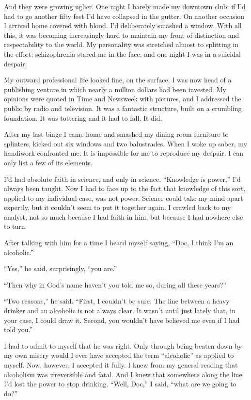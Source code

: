 \begin{biblechapter}
And they were growing uglier. One night I barely made my downtown club; if I’d had to go another fifty feet I’d have collapsed in the gutter. On another occasion I arrived home covered with blood. I’d deliberately smashed a window. With all this, it was becoming increasingly hard to maintain my front of distinction and respectability to the world. My personality was stretched almost to splitting in the effort; schizophrenia stared me in the face, and one night I was in a suicidal despair.

My outward professional life looked fine, on the surface. I was now head of a publishing venture in which nearly a million dollars had been invested. My opinions were quoted in Time and Newsweek with pictures, and I addressed the public by radio and television. It was a fantastic structure, built on a crumbling foundation. It was tottering and it had to fall. It did.

After my last binge I came home and smashed my dining room furniture to splinters, kicked out six windows and two balustrades. When I woke up sober, my handiwork confronted me. It is impossible for me to reproduce my despair. I can only list a few of its elements.

I’d had absolute faith in science, and only in science. “Knowledge is power,” I’d always been taught. Now I had to face up to the fact that knowledge of this sort, applied to my individual case, was not power. Science could take my mind apart expertly, but it couldn’t seem to put it together again. I crawled back to my analyst, not so much because I had faith in him, but because I had nowhere else to turn.

After talking with him for a time I heard myself saying, “Doc, I think I’m an alcoholic.”

“Yes,” he said, surprisingly, “you are.”

“Then why in God’s name haven’t you told me so, during all these years?”

“Two reasons,” he said. “First, I couldn’t be sure. The line between a heavy drinker and an alcoholic is not always clear. It wasn’t until just lately that, in your case, I could draw it. Second, you wouldn’t have believed me even if I had told you.”

I had to admit to myself that he was right. Only through being beaten down by my own misery would I ever have accepted the term “alcoholic” as applied to myself. Now, however, I accepted it fully. I knew from my general reading that alcoholism was irreversible and fatal. And I knew that somewhere along the line I’d lost the power to stop drinking. “Well, Doc,” I said, “what are we going to do?”


\end{biblechapter}
